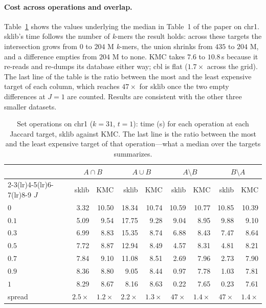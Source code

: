 \documentclass[runningheads,a4paper]{llncs}
\newcommand{\kmers}{\emph{k}-mers\xspace}
\newcommand{\sklib}{\textsf{sklib}\xspace}
\newcommand{\kmc}{\textsf{KMC}\xspace}
\newcommand{\cbl}{\textsf{cbl}\xspace}
\newif\ifrevmarkup\revmarkupfalse
\newcommand{\rev}[1]{\ifrevmarkup\textcolor{blue}{#1}\else#1\fi}
\newenvironment{revblock}{\ifrevmarkup\color{blue}\fi}{}
\begin{document}
\begin{revblock}
\paragraph{Cost across operations and overlap.}
Table~\ref{tab:setops-grid} shows the values underlying the median in Table~1 of the paper on chr1. \sklib{}'s time follows the number of \kmers the result holds: across these targets the intersection grows from $0$ to $204$ M \kmers, the union shrinks from $435$ to $204$ M, and a difference empties from $204$ M to none. \kmc{} takes $7.6$ to $10.8$\,s because it re-reads and re-dumps its database either way; \cbl{} is flat ($1.7\times$ across the grid). The last line of the table is the ratio between the most and the least expensive target of each column, which reaches $47\times$ for \sklib{} once the two empty differences at $J=1$ are counted. Results are consistent with the other three smaller datasets.

\begin{table}[h]
\centering
\caption{\rev{Set operations on chr1 ($k=31$, $t=1$): time (s) for each operation at each Jaccard target, \sklib{} against \kmc{}. The last line is the ratio between the most and the least expensive target of that operation---what a median over the targets summarizes.}}
\label{tab:setops-grid}
\small
\setlength{\tabcolsep}{4.5pt}
\begin{revblock}
\begin{tabular}{lrrrrrrrr}
\toprule
 & \multicolumn{2}{c}{$A\cap B$} & \multicolumn{2}{c}{$A\cup B$} & \multicolumn{2}{c}{$A\setminus B$} & \multicolumn{2}{c}{$B\setminus A$} \\
\cmidrule(lr){2-3}\cmidrule(lr){4-5}\cmidrule(lr){6-7}\cmidrule(lr){8-9}
$J$ & \sklib{} & \kmc{} & \sklib{} & \kmc{} & \sklib{} & \kmc{} & \sklib{} & \kmc{} \\
\midrule
$0$   & 3.32 & 10.50 & 18.34 & 10.74 & 10.59 & 10.77 & 10.85 & 10.39 \\
$0.1$ & 5.09 &  9.54 & 17.75 &  9.28 &  9.04 &  8.95 &  9.88 &  9.10 \\
$0.3$ & 6.99 &  8.83 & 15.35 &  8.74 &  6.88 &  8.43 &  7.47 &  8.64 \\
$0.5$ & 7.72 &  8.87 & 12.94 &  8.49 &  4.57 &  8.31 &  4.81 &  8.21 \\
$0.7$ & 7.84 &  9.10 & 11.08 &  8.51 &  2.69 &  7.96 &  2.73 &  7.90 \\
$0.9$ & 8.36 &  8.80 &  9.05 &  8.44 &  0.97 &  7.78 &  1.03 &  7.81 \\
$1$   & 8.29 &  8.67 &  8.16 &  8.63 &  0.22 &  7.65 &  0.23 &  7.61 \\
\midrule
spread & $2.5\times$ & $1.2\times$ & $2.2\times$ & $1.3\times$ & $47\times$ & $1.4\times$ & $47\times$ & $1.4\times$ \\
\bottomrule
\end{tabular}
\end{revblock}
\end{table}
\end{revblock}
\end{document}

